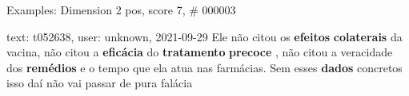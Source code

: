 \begin{frame}{Examples: Dimension 2 pos, score 7, \# 000003}
\footnotesize
\begin{exampleblock}{text: t052638, user: unknown, 2021-09-29}
Ele não citou os \textbf{efeitos} \textbf{colaterais} da vacina, não citou a 
\textbf{eficácia} do \textbf{tratamento} \textbf{precoce} , não citou a 
veracidade dos \textbf{remédios} e o tempo que ela atua nas farmácias. Sem 
esses \textbf{dados} concretos isso daí não vai passar de pura falácia 
\end{exampleblock}
\end{frame}
